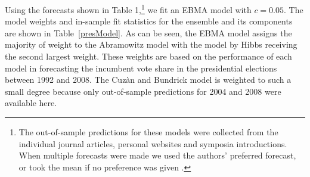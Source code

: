 \documentclass[12pt,fullpage,endnotes]{article}
\begin{document}
Using the forecasts shown in Table 1,\footnote{The out-of-sample predictions for these models were collected from the individual journal articles, personal websites and symposia introductions. When multiple forecasts were made we used the authors' preferred forecast, or took the mean if no preference was given \citep{Hibbs:1992,Holbrook:1996,LewisBeckTien:1996,EriksonWlezien:1996,Abramowitz:2000,Hibbs:2000,CampbellGarand:2000,Campbell:2000,Campbell:2001,Hibbs:2004,Campbell:2004,Campbell:2005,Campbell:2008a,Abramowitz:2012,Campbell:2012,Cuzan:2012,EriksonWlezien:2012,Fair:2012,Hibbs:2012a,Holbrook:2012,LewisBeckTien:2012,Lockerbie:2012}.} we fit an EBMA model with
$c=0.05$.  The model weights and in-sample fit statistics for the ensemble and its components are shown in Table~\ref{presModel}.  As
can be seen, the EBMA model assigns the majority of weight to the Abramowitz model with the model by Hibbs receiving the second largest weight. These weights are based on the performance of each
model in forecasting the incumbent vote share in the presidential elections between 1992 and 2008. The Cuz\`an and Bundrick model is
weighted to such a small degree because only out-of-sample predictions for 2004 and 2008 were available here.
\end{document}

